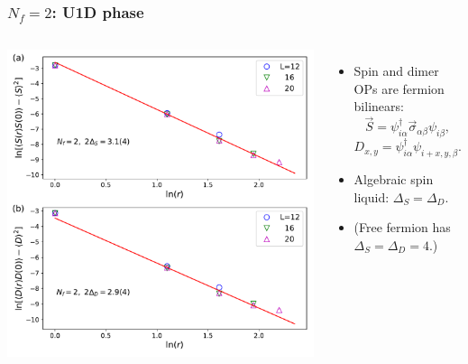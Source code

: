 \documentclass[xcolor=table, 10pt, aspectratio=169]{beamer}
\begin{document}
\begin{frame}
  \frametitle{$N_f=2$: U1D phase}
  \begin{columns}
    \includegraphics[width=\textwidth]{n2decay}
		\begin{itemize}
			\item Spin and dimer OPs are fermion bilinears:
			\[\vec S = \psi^\dagger_{i\alpha}\vec\sigma_{\alpha\beta}\psi_{i\beta},\]
			\[D_{x,y} = \psi^\dagger_{i\alpha}\psi_{i+x,y,\beta}.\]
			\item Algebraic spin liquid: $\Delta_S = \Delta_D$.
		  \item (Free fermion has $\Delta_S=\Delta_D = 4$.)
		\end{itemize}
  \end{columns}
\end{frame}
\end{document}
